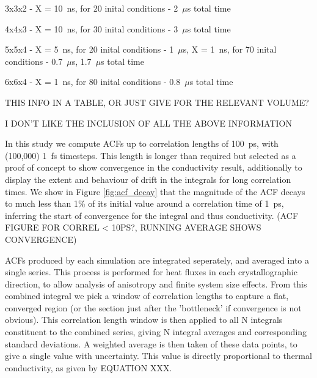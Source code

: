 \documentclass[%
preprint,                                  %
nofootinbib,
 amsmath,amssymb,
 aps,
]{revtex4-1}
\begin{document}
3x3x2 - X = 10~ns, for 20 inital conditions - 2~$\mu$s total time

4x4x3 - X = 10~ns, for 30 inital conditions - 3~$\mu$s total time

5x5x4 - X = 5~ns, for 20 inital conditions - 1~$\mu$s, X = 1~ns, for 70 inital conditions - 0.7~$\mu$s, 1.7~$\mu$s total time

6x6x4 - X = 1~ns, for 80 inital conditions - 0.8~$\mu$s total time

THIS INFO IN A TABLE, OR JUST GIVE FOR THE RELEVANT VOLUME?

I DON'T LIKE THE INCLUSION OF ALL THE ABOVE INFORMATION

In this study we compute ACFs up to correlation lengths of 100~ps, with (100,000) 1~fs timesteps. This length is longer than required but selected as a proof of concept to show convergence in the conductivity result, additionally to display the extent and behaviour of drift in the integrals for long correlation times. We show in Figure \ref{fig:acf_decay} that the magnitude of the ACF decays to much less than 1\% of its initial value around a correlation time of 1~ps, inferring the start of convergence for the integral and thus conductivity. (ACF FIGURE FOR CORREL < 10PS?, RUNNING AVERAGE SHOWS CONVERGENCE) 


ACFs produced by each simulation are integrated seperately, and averaged into a single series. This process is performed for heat fluxes in each crystallographic direction, to allow analysis of anisotropy and finite system size effects.  From this combined integral we pick a window of correlation lengths to capture a flat, converged region (or the section just after the 'bottleneck' if convergence is not obvious). This correlation length window is then applied to all N integrals constituent to the combined series, giving N integral averages and corresponding standard deviations. A weighted average is then taken of these data points, to give a single value with uncertainty. This value is directly proportional to thermal conductivity, as given by EQUATION XXX.
\end{document}
